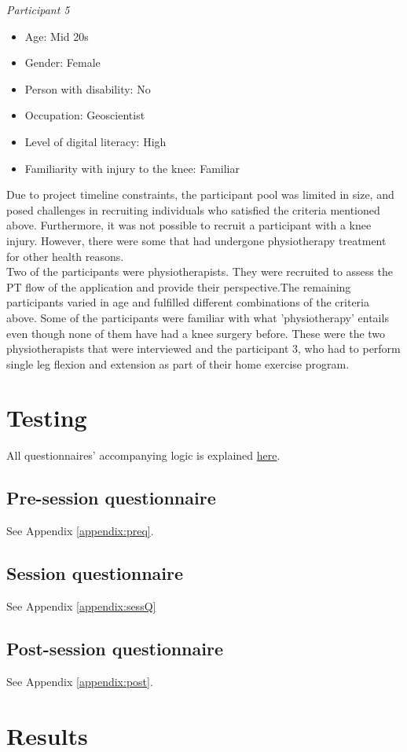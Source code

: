 \documentclass[12pt, titlepage]{article}
\begin{document}
\textit{Participant 5}
\begin{itemize}
    \item Age: Mid 20s
    \item Gender: Female
    \item Person with disability: No
    \item Occupation: Geoscientist
    \item Level of digital literacy: High
    \item Familiarity with injury to the knee: Familiar
\end{itemize}
Due to project timeline constraints, the participant pool was limited in size, and posed challenges in recruiting 
individuals who satisfied the criteria mentioned above. Furthermore, it was not possible to recruit a participant 
with a knee injury. However, there were some that had undergone physiotherapy treatment for other health reasons. \\
Two of the participants were physiotherapists. They were recruited to assess the PT flow of the application and 
provide their perspective.The remaining participants varied in age and fulfilled different combinations 
of the criteria above. Some of the participants were familiar with what 'physiotherapy' entails even though
none of them have had a knee surgery before. These were the two physiotherapists that were interviewed and the
participant 3, who had to perform single leg flexion and extension as part of their home exercise program.

\section{Testing}
All questionnaires' accompanying logic is explained \href{QuestionsExplanations.pdf}{here}.
\subsection{Pre-session questionnaire}
See Appendix \ref{appendix:preq}.
\subsection{Session questionnaire}
See Appendix \ref{appendix:sessQ} 
\subsection{Post-session questionnaire}
See Appendix \ref{appendix:post}.


\section{Results}
\end{document}
